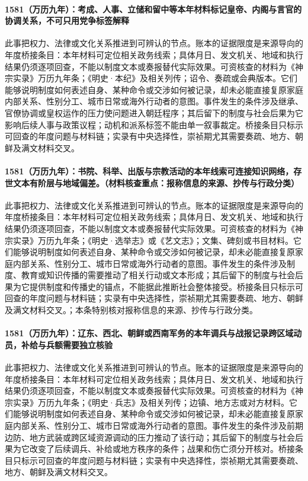 \paragraph{1581（万历九年）：考成、人事、立储和留中等本年材料标记皇帝、内阁与言官的协调关系，不可只用党争标签解释} 此事把权力、法律或文化关系推进到可辨认的节点。账本的证据限度是来源导向的年度桥接条目：本年材料可定位相关政务线索；具体月日、发文机关、地域和执行结果仍须逐项回查，不能以制度文本或奏报替代实际效果。可资核查的材料为《神宗实录》万历九年条；《明史·本纪》及相关列传；诏令、奏疏或会典版本。它们能够说明制度如何表述自身、某种命令或交涉如何被记录，却未必能直接复原家庭内部关系、性别分工、城市日常或海外行动者的意图。事件发生的条件涉及继承、官僚协调或皇权运作的压力使问题进入朝廷程序；其后留下的制度与社会后果为它影响后续人事与政策议程；动机和派系标签不能由单一叙事裁定。桥接条目只标示可回查的年度问题与材料链；实录有中央选择性，崇祯期尤其需要奏疏、地方、朝鲜及满文材料交叉。

\paragraph{1581（万历九年）：书院、科举、出版与宗教活动的本年线索可连接知识网络，存世文本有阶层与地域偏差。（材料核查重点：报称信息的来源、抄传与行政分类）} 此事把权力、法律或文化关系推进到可辨认的节点。账本的证据限度是来源导向的年度桥接条目：本年材料可定位相关政务线索；具体月日、发文机关、地域和执行结果仍须逐项回查，不能以制度文本或奏报替代实际效果。可资核查的材料为《神宗实录》万历九年条；《明史·选举志》或《艺文志》；文集、碑刻或书目材料。它们能够说明制度如何表述自身、某种命令或交涉如何被记录，却未必能直接复原家庭内部关系、性别分工、城市日常或海外行动者的意图。事件发生的条件涉及制度、教育或知识传播的需要推动了相关行动或文本形成；其后留下的制度与社会后果为它提供制度和传播史的锚点，不能据此推断社会整体接受。桥接条目只标示可回查的年度问题与材料链；实录有中央选择性，崇祯期尤其需要奏疏、地方、朝鲜及满文材料交叉。；本条特别核对报称信息的来源、抄传与行政分类。

\paragraph{1581（万历九年）：辽东、西北、朝鲜或西南军务的本年调兵与战报记录跨区域动员，补给与兵额需要独立核验} 此事把权力、法律或文化关系推进到可辨认的节点。账本的证据限度是来源导向的年度桥接条目：本年材料可定位相关政务线索；具体月日、发文机关、地域和执行结果仍须逐项回查，不能以制度文本或奏报替代实际效果。可资核查的材料为《神宗实录》万历九年条；《明史·兵志》及相关列传；边镇、地方志或对方材料。它们能够说明制度如何表述自身、某种命令或交涉如何被记录，却未必能直接复原家庭内部关系、性别分工、城市日常或海外行动者的意图。事件发生的条件涉及前期边防、地方武装或跨区域资源调动的压力推动了该行动；其后留下的制度与社会后果为它改变了后续调兵、补给或地方秩序的条件；战果和伤亡须分开核对。桥接条目只标示可回查的年度问题与材料链；实录有中央选择性，崇祯期尤其需要奏疏、地方、朝鲜及满文材料交叉。

